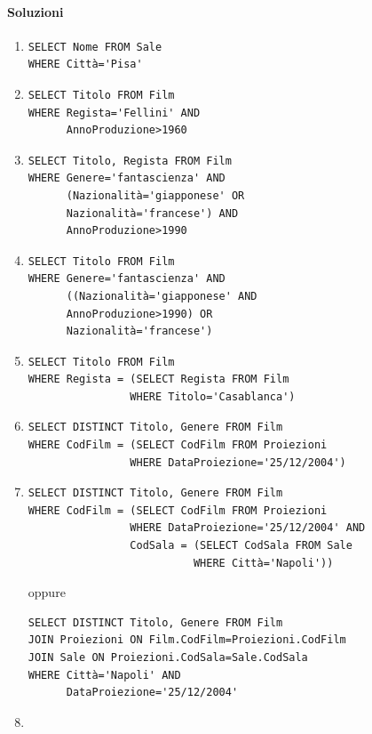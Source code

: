 \documentclass[a4paper]{article}
\begin{document}
\paragraph{Soluzioni}
\begin{enumerate}
\item
\begin{verbatim}
SELECT Nome FROM Sale
WHERE Città='Pisa'
\end{verbatim}
\item
\begin{verbatim}
SELECT Titolo FROM Film
WHERE Regista='Fellini' AND
      AnnoProduzione>1960
\end{verbatim}
\item
\begin{verbatim}
SELECT Titolo, Regista FROM Film
WHERE Genere='fantascienza' AND
      (Nazionalità='giapponese' OR
      Nazionalità='francese') AND
      AnnoProduzione>1990
\end{verbatim}
\item
\begin{verbatim}
SELECT Titolo FROM Film
WHERE Genere='fantascienza' AND
      ((Nazionalità='giapponese' AND
      AnnoProduzione>1990) OR
      Nazionalità='francese')
\end{verbatim}
\item
\begin{verbatim}
SELECT Titolo FROM Film
WHERE Regista = (SELECT Regista FROM Film
                WHERE Titolo='Casablanca')
\end{verbatim}
\item
\begin{verbatim}
SELECT DISTINCT Titolo, Genere FROM Film
WHERE CodFilm = (SELECT CodFilm FROM Proiezioni
                WHERE DataProiezione='25/12/2004')
\end{verbatim}
\item
\begin{verbatim}
SELECT DISTINCT Titolo, Genere FROM Film
WHERE CodFilm = (SELECT CodFilm FROM Proiezioni
                WHERE DataProiezione='25/12/2004' AND
                CodSala = (SELECT CodSala FROM Sale
                          WHERE Città='Napoli'))
\end{verbatim}
oppure
\begin{verbatim}
SELECT DISTINCT Titolo, Genere FROM Film
JOIN Proiezioni ON Film.CodFilm=Proiezioni.CodFilm
JOIN Sale ON Proiezioni.CodSala=Sale.CodSala
WHERE Città='Napoli' AND
      DataProiezione='25/12/2004'
\end{verbatim}
\item

\end{enumerate}
\end{document}
